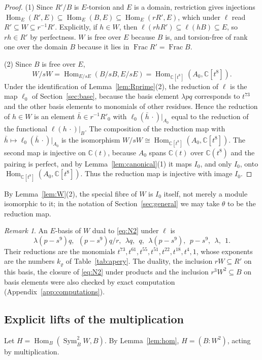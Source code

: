 \documentclass{amsart}
\theoremstyle{definition}
\theoremstyle{remark}
\newtheorem{remark}[theorem]{Remark}
\numberwithin{equation}{section}
\newcommand{\C}{\mathbb{C}}
\DeclareMathOperator{\Hom}{Hom}
\DeclareMathOperator{\Sym}{Sym}
\DeclareMathOperator{\Frac}{Frac}
\begin{document}
\begin{proof}
(1) Since $R'/B$ is $E$-torsion and $E$ is a domain, restriction gives injections $\Hom_E(R',E)\subseteq\Hom_E(B,E)\subseteq\Hom_E(rR',E)$, which under $\ell$ read $R'\subseteq W\subseteq r^{-1}R'$. Explicitly, if $h\in W$, then $\ell(rhR')\subseteq\ell(hB)\subseteq E$, so $rh\in R'$ by perfectness. $W$ is free over $E$ because $B$ is, and torsion-free of rank one over the domain $B$ because it lies in $\Frac R'=\Frac B$.

(2) Since $B$ is free over $E$,
\[
W/sW=\Hom_{E/sE}(B/sB,E/sE)=\Hom_{\C[t^8]}(A_0,\C[t^8]).
\] Under the identification of Lemma~\ref{lem:Rprime}(2), the reduction of $\ell$ is the map $\ell_0$ of Section~\ref{sec:base}, because the basis element $\lambda pq$ corresponds to $t^{73}$ and the other basis elements to monomials of other residues. Hence the reduction of $h\in W$ is an element $\bar h\in r^{-1}R'_0$ with $\ell_0(\bar h\,\cdot)|_{A_0}$ equal to the reduction of the functional $\ell(h\,\cdot)|_B$. The composition of the reduction map with $\bar h\mapsto\ell_0(\bar h\,\cdot)|_{A_0}$ is the isomorphism $W/sW\cong\Hom_{\C[t^8]}(A_0,\C[t^8])$. The second map is injective on $\C(t)$, because $A_0$ spans $\C(t)$ over $\C(t^8)$ and the pairing is perfect, and by Lemma~\ref{lem:canonical}(1) it maps $I_0$, and only $I_0$, onto $\Hom_{\C[t^8]}(A_0,\C[t^8])$. Thus the reduction map is injective with image $I_0$.
\end{proof}

By Lemma~\ref{lem:W}(2), the special fibre of $W$ is $I_0$ itself, not merely a module isomorphic to it; in the notation of Section~\ref{sec:general} we may take $\theta$ to be the reduction map.

\begin{remark}\label{rem:dualbasis}
An $E$-basis of $W$ dual to \eqref{eq:N2} under $\ell$ is
\[
\lambda(p-s^9)q,\ \ (p-s^9)q/r,\ \ \lambda q,\ \ q,\ \ \lambda(p-s^9),\ \ p-s^9,\ \ \lambda,\ \ 1 .
\]
Their reductions are the monomials $t^{73},t^{61},t^{55},t^{51},t^{22},t^{18},t^4,1$, whose exponents are the numbers $k_\varrho$ of Table~\ref{tab:apery}. The duality, the inclusion $rW\subseteq R'$ on this basis, the closure of \eqref{eq:N2} under products and the inclusion $r^3W^2\subseteq B$ on basis elements were also checked by exact computation (Appendix~\ref{app:computations}).
\end{remark}

\subsection{Explicit lifts of the multiplication}
Let $H=\Hom_B(\Sym^2_BW,B)$. By Lemma~\ref{lem:hom}, $H=(B:W^2)$, acting by multiplication.
\end{document}
